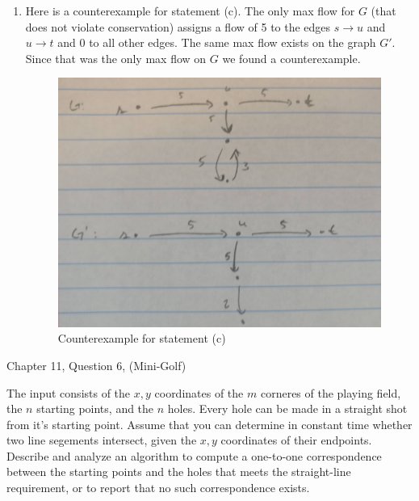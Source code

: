 \documentclass{article}
\begin{document}
\begin{enumerate}[label=(\alph*)]
    \newpage
    \item Here is a counterexample for statement (c).
    The only max flow for $G$ (that does not violate conservation) assigns a flow of 5 to the edges $s \to u$ and $u \to t$ and 0 to all other edges.
    The same max flow exists on the graph $G'$. Since that was the only max flow on $G$ we found a counterexample.
        \begin{figure}[h]
        \begin{center}
            \includegraphics[scale=0.25]{img/7-4-c}
            \caption{Counterexample for statement (c)}
            \label{fig:7-4-c}
        \end{center}
        \end{figure}
\end{enumerate}


\nextprob
{}

Chapter 11, Question 6, (Mini-Golf)

The input consists of the $x,y$ coordinates of the $m$ corneres of the playing field, the $n$ starting points, and the $n$ holes.
Every hole can be made in a straight shot from it's starting point.
Assume that you can determine in constant time whether two line segements intersect, given the $x,y$ coordinates of their endpoints.
Describe and analyze an algorithm to compute a one-to-one correspondence between the starting points and the holes that meets the straight-line requirement, or to report that no such correspondence exists.
\end{document}
